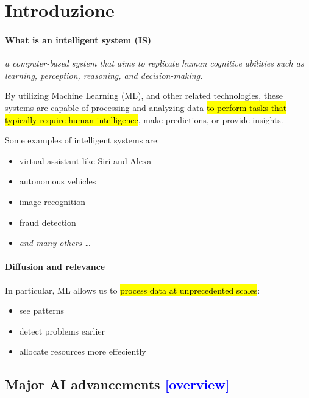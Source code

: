 \chapter{Introduzione}

\subsubsection{What is an intelligent system (IS)}
\begin{center}
    \textit{a computer-based system that aims to replicate human cognitive abilities such as learning, perception, reasoning, and decision-making. }
\end{center}





\noindent By utilizing Machine Learning (ML), and other related technologies, these systems are capable of processing and analyzing data 
\hl{to perform tasks that typically require human intelligence}, make predictions, or provide insights.

\noindent Some examples of intelligent systems are:
\begin{itemize}
    \item virtual assistant like Siri and Alexa 
    \item autonomous vehicles 
    \item image recognition 
    \item fraud detection 
    \item \textit{and many others \dots}
\end{itemize}

\subsubsection{Diffusion and relevance}
In particular, ML allows us to \hl{process data at unprecedented scales}:
\begin{itemize}
    \item see patterns 
    \item detect problems earlier 
    \item allocate resources more effeciently
\end{itemize}

\newpage
\section{Major AI advancements \textcolor{blue}{[overview]}}

